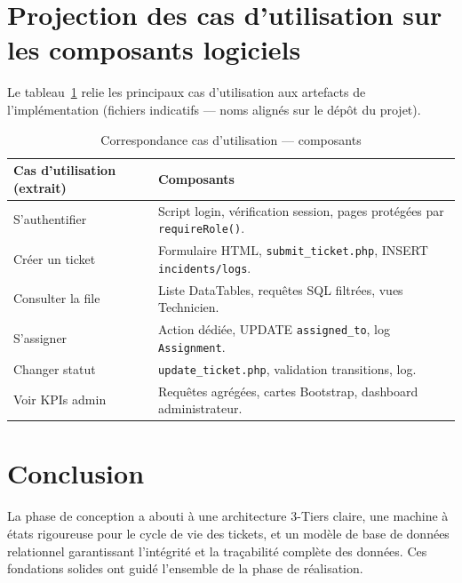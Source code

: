 \section{Projection des cas d'utilisation sur les composants logiciels}
Le tableau~\ref{tab:corresp_uc} relie les principaux cas d'utilisation aux artefacts de
l'implémentation (fichiers indicatifs — noms alignés sur le dépôt du projet).

\begin{table}[H]
\centering
\small
\begin{tabular}{@{}p{4.5cm}p{10.5cm}@{}}
\toprule
\textbf{Cas d'utilisation (extrait)} & \textbf{Composants} \\
\midrule
S'authentifier & Script login, vérification session, pages protégées par \texttt{requireRole()}. \\
Créer un ticket & Formulaire HTML, \texttt{submit\_ticket.php}, INSERT \texttt{incidents/logs}. \\
Consulter la file & Liste DataTables, requêtes SQL filtrées, vues Technicien. \\
S'assigner & Action dédiée, UPDATE \texttt{assigned\_to}, log \texttt{Assignment}. \\
Changer statut & \texttt{update\_ticket.php}, validation transitions, log. \\
Voir KPIs admin & Requêtes agrégées, cartes Bootstrap, dashboard administrateur. \\
\bottomrule
\end{tabular}
\caption{Correspondance cas d'utilisation — composants}
\label{tab:corresp_uc}
\end{table}

\section{Conclusion}
La phase de conception a abouti à une architecture 3-Tiers claire, une machine à
états rigoureuse pour le cycle de vie des tickets, et un modèle de base de données
relationnel garantissant l'intégrité et la traçabilité complète des données. Ces
fondations solides ont guidé l'ensemble de la phase de réalisation.
